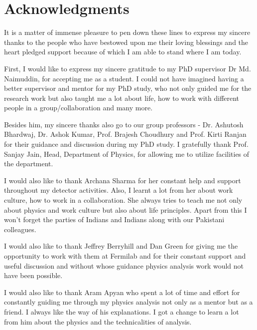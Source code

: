 
\chapter*{Acknowledgments}
It is a matter of immense pleasure to pen down these lines to express my sincere thanks to the people who have bestowed upon me their loving blessings and the heart pledged support because of which I am able to stand where I am today.

First, I would like to express my sincere gratitude to my PhD supervisor Dr Md. Naimuddin, for accepting me as a student. I could not have imagined having a better supervisor and mentor for my PhD study, who not only guided me for the research work but also taught me a lot about life, how to work with different people in a group/collaboration and many more.

Besides him, my sincere thanks also go to our group professors - Dr. Ashutosh Bhardwaj, Dr. Ashok Kumar, Prof. Brajesh Choudhury and Prof. Kirti Ranjan for their guidance and discussion during my PhD study. I gratefully thank Prof. Sanjay Jain, Head, Department of Physics, for allowing me to utilize facilities of the department. 


I would also like to thank Archana Sharma for her constant help and support throughout my detector activities. Also, I learnt a lot from her about work culture, how to work in a collaboration. She always tries to teach me not only about physics and work culture but also about life principles. Apart from this I won't forget the parties of Indians and Indians along with our Pakistani colleagues. 

I would also like to thank Jeffrey Berryhill and Dan Green for giving me the opportunity to work with them at Fermilab and for their constant support and useful discussion and without whose guidance physics analysis work would not have been possible.

I would also like to thank Aram Apyan who spent a lot of time and effort for constantly guiding me through my physics analysis not only as a mentor but as a friend. I always like the way of his explanations. I got a change to learn a lot from him about the physics and the technicalities of analysis.


